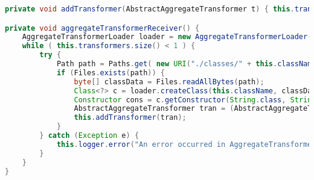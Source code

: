 \begin{lstlisting}[language=Java, label=atr, caption={Metoden \emph{addTransformer}, og metoden \emph{aggregateTransformerReceiver}, som kjøres i en separat tråd idet \textbf{Migrator}-konstruktøren kalles.}]
private void addTransformer(AbstractAggregateTransformer t) { this.transformers.put(t.getAppVersion(), t); }

private void aggregateTransformerReceiver() {
    AggregateTransformerLoader loader = new AggregateTransformerLoader();
    while ( this.transformers.size() < 1 ) {
        try {
            Path path = Paths.get( new URI("./classes/" + this.className + ".class"));
            if (Files.exists(path)) {
                byte[] classData = Files.readAllBytes(path);
                Class<?> c = loader.createClass(this.className, classData);
                Constructor cons = c.getConstructor(String.class, String.class);
                AbstractAggregateTransformer tran = (AbstractAggregateTransformer) cons.newInstance( "x", "y" );
                this.addTransformer(tran);
            }
        } catch (Exception e) {
            this.logger.error("An error occurred in AggregateTransformerReceiver ", e);
        }
    }
}
\end{lstlisting}
